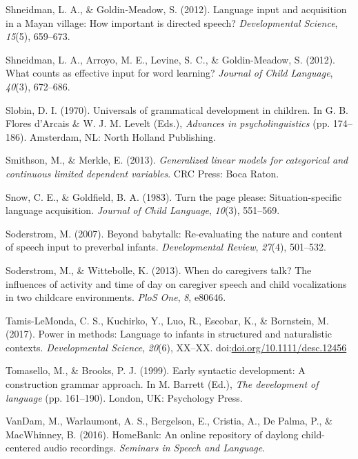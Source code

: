 \documentclass[floatsintext,man]{apa6}
\theoremstyle{definition}
\theoremstyle{definition}
\theoremstyle{definition}
\theoremstyle{remark}
\begin{document}
\hypertarget{ref-shneidman2012language}{}
Shneidman, L. A., \& Goldin-Meadow, S. (2012). Language input and
acquisition in a Mayan village: How important is directed speech?
\emph{Developmental Science}, \emph{15}(5), 659--673.

\hypertarget{ref-shneidman2012counts}{}
Shneidman, L. A., Arroyo, M. E., Levine, S. C., \& Goldin-Meadow, S.
(2012). What counts as effective input for word learning? \emph{Journal
of Child Language}, \emph{40}(3), 672--686.

\hypertarget{ref-slobin1970universals}{}
Slobin, D. I. (1970). Universals of grammatical development in children.
In G. B. Flores d'Arcais \& W. J. M. Levelt (Eds.), \emph{Advances in
psycholinguistics} (pp. 174--186). Amsterdam, NL: North Holland
Publishing.

\hypertarget{ref-smithson2013generalized}{}
Smithson, M., \& Merkle, E. (2013). \emph{Generalized linear models for
categorical and continuous limited dependent variables}. CRC Press: Boca
Raton.

\hypertarget{ref-snow1983turn}{}
Snow, C. E., \& Goldfield, B. A. (1983). Turn the page please:
Situation-specific language acquisition. \emph{Journal of Child
Language}, \emph{10}(3), 551--569.

\hypertarget{ref-soderstrom2007beyond}{}
Soderstrom, M. (2007). Beyond babytalk: Re-evaluating the nature and
content of speech input to preverbal infants. \emph{Developmental
Review}, \emph{27}(4), 501--532.

\hypertarget{ref-soderstrom2013when}{}
Soderstrom, M., \& Wittebolle, K. (2013). When do caregivers talk? The
influences of activity and time of day on caregiver speech and child
vocalizations in two childcare environments. \emph{PloS One}, \emph{8},
e80646.

\hypertarget{ref-tamislemonda2017power}{}
Tamis-LeMonda, C. S., Kuchirko, Y., Luo, R., Escobar, K., \& Bornstein,
M. (2017). Power in methods: Language to infants in structured and
naturalistic contexts. \emph{Developmental Science}, \emph{20}(6),
XX--XX.
doi:\href{https://doi.org/doi.org/10.1111/desc.12456}{doi.org/10.1111/desc.12456}

\hypertarget{ref-tomasello1999early}{}
Tomasello, M., \& Brooks, P. J. (1999). Early syntactic development: A
construction grammar approach. In M. Barrett (Ed.), \emph{The
development of language} (pp. 161--190). London, UK: Psychology Press.

\hypertarget{ref-HomeBank}{}
VanDam, M., Warlaumont, A. S., Bergelson, E., Cristia, A., De Palma, P.,
\& MacWhinney, B. (2016). HomeBank: An online repository of daylong
child-centered audio recordings. \emph{Seminars in Speech and Language}.
\end{document}
